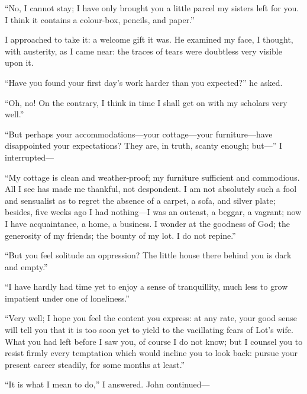 \enquote{No, I cannot stay; I have only brought you a little parcel my
sisters left for you. I think it contains a colour-box, pencils, and
paper.}

I approached to take it: a welcome gift it was. He examined my face, I
thought, with austerity, as I came near: the traces of tears were
doubtless very visible upon it.

\enquote{Have you found your first day's work harder than you expected?}
he asked.

\enquote{Oh, no! On the contrary, I think in time I shall get on with
my scholars very well.}

\enquote{But perhaps your accommodations---your cottage---your
furniture---have disappointed your expectations? They are, in truth,
scanty enough; but---} I interrupted---

\enquote{My cottage is clean and weather-proof; my furniture sufficient
and commodious. All I see has made me thankful, not despondent. I am
not absolutely such a fool and sensualist as to regret the absence of a
carpet, a sofa, and silver plate; besides, five weeks ago I had
nothing---I was an outcast, a beggar, a vagrant; now I have
acquaintance, a home, a business. I wonder at the goodness of God; the
generosity of my friends; the bounty of my lot. I do not repine.}

\enquote{But you feel solitude an oppression? The little house there
behind you is dark and empty.}

\enquote{I have hardly had time yet to enjoy a sense of tranquillity,
much less to grow impatient under one of loneliness.}

\enquote{Very well; I hope you feel the content you express: at any
rate, your good sense will tell you that it is too soon yet to yield to
the vacillating fears of Lot's wife. What you had left before I saw
you, of course I do not know; but I counsel you to resist firmly every
temptation which would incline you to look back: pursue your present
career steadily, for some months at least.}

\enquote{It is what I mean to do,} I answered. \St{} John continued---

